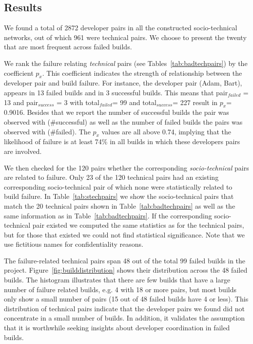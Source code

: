 \subsection{Results}
We found a total of 2872 developer pairs in all the constructed
socio-technical networks, out of which 961 were technical pairs. %
We choose to present the twenty that are most frequent across failed builds.

We rank the failure relating \emph{technical} pairs (see Tables~\ref{tab:badtechpairs})
by the coefficient $p_{x}$. This coefficient indicates the strength of
relationship between the developer pair and build failure. For instance, the
developer pair (Adam, Bart), appears in 13 failed builds and in 3
successful builds. This means that pair$_{failed}$ = 13 and pair$_{success}$ = 3
with total$_{failed}$= 99 and total$_{success}$= 227 result in $p_x$= 0.9016.
Besides that we report the number of successful builds the pair was observed with
(\#successful) as well as the number of failed builds the pairs was observed with
(\#failed). The $p_x$ values are all above 0.74, implying that the likelihood
of failure is at least 74\% in all builds in which these developers pairs are
involved. 

We then checked for the 120 pairs whether the corresponding \emph{socio-technical} pairs are related to failure.
Only 23 of the 120 technical pairs had an existing corresponding socio-technical pair of which none were statistically related to build failure. 
In Table~\ref{tab:stechpairs} we show the socio-technical pairs that match the 20 technical pairs shown in Table~\ref{tab:badtechpairs} as well as the same information as in Table~\ref{tab:badtechpairs}.
If the corresponding socio-technical pair existed we computed the same statistics as for the technical pairs, but for those that existed we could not find statistical significance.
Note that we use fictitious names for confidentiality reasons.

The failure-related technical pairs span 48 out of the total 99 failed builds in
the project. Figure~\ref{fig:builddistribution} shows their distribution
 across the 48 failed builds. The histogram
illustrates that there are few builds that have a large number of failure related
builds, e.g. 4 with 18 or more pairs, but most builds only show a small number of
pairs (15 out of 48 failed builds have 4 or less). 
This distribution of technical pairs indicate that the developer
pairs we found  did not concentrate in a small number of builds. 
In addition, it validates the assumption that it is
worthwhile seeking insights about developer coordination in failed builds.


